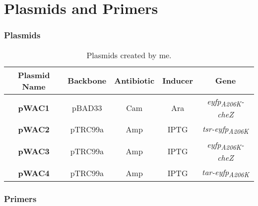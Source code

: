 \documentclass[../main.tex]{subfiles}
\begin{document}
\setcounter{section}{0}
\part{Plasmids and Primers}

\section{Plasmids}
\begin{table}[h!]
\begin{center}
\begin{tabular}{c|c|c|c|c}
\textbf{Plasmid Name} 	&	\textbf{Backbone}	&	\textbf{Antibiotic}	&		\textbf{Inducer}	&	\textbf{Gene}\\\hline
\textbf{pWAC1}			&	pBAD33				&	Cam					&		Ara				&	\textit{eyfp\textsubscript{A206K}-cheZ}\\
\textbf{pWAC2}			&	pTRC99a				&	Amp					&		IPTG				&	\textit{tsr-eyfp\textsubscript{A206K}}\\
\textbf{pWAC3}			&	pTRC99a				&	Amp					&		IPTG				&	\textit{eyfp\textsubscript{A206K}-cheZ}\\
\textbf{pWAC4}			&	pTRC99a				&	Amp					&		IPTG				&	\textit{tar-eyfp\textsubscript{A206K}}
\end{tabular}
\caption{Plasmids created by me.}
\label{tbl:myplasmids}
\end{center}
\end{table}

\section{Primers}
\end{document}
